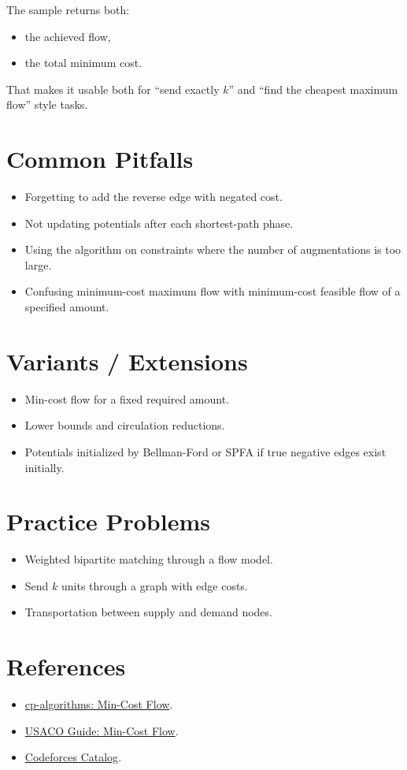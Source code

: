 The sample returns both:

\begin{itemize}
  \item the achieved flow,
  \item the total minimum cost.
\end{itemize}

That makes it usable both for ``send exactly \(k\)'' and ``find the cheapest maximum flow'' style tasks.

\section*{Common Pitfalls}

\begin{itemize}
  \item Forgetting to add the reverse edge with negated cost.
  \item Not updating potentials after each shortest-path phase.
  \item Using the algorithm on constraints where the number of augmentations is too large.
  \item Confusing minimum-cost maximum flow with minimum-cost feasible flow of a specified amount.
\end{itemize}

\section*{Variants / Extensions}

\begin{itemize}
  \item Min-cost flow for a fixed required amount.
  \item Lower bounds and circulation reductions.
  \item Potentials initialized by Bellman-Ford or SPFA if true negative edges exist initially.
\end{itemize}

\section*{Practice Problems}

\begin{itemize}
  \item Weighted bipartite matching through a flow model.
  \item Send \(k\) units through a graph with edge costs.
  \item Transportation between supply and demand nodes.
\end{itemize}

\section*{References}

\begin{itemize}
  \item \href{https://cp-algorithms.com/graph/min_cost_flow.html}{cp-algorithms: Min-Cost Flow}.
  \item \href{https://usaco.guide/adv/min-cost-flow}{USACO Guide: Min-Cost Flow}.
  \item \href{https://codeforces.com/catalog}{Codeforces Catalog}.
\end{itemize}
